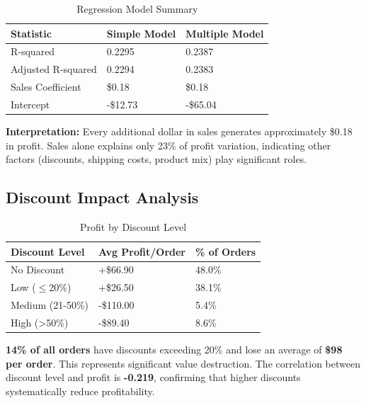 \documentclass[11pt,a4paper]{article}
\begin{document}
\begin{table}[H]
\centering
\begin{tabular}{@{}p{4cm} p{3cm} p{3cm}@{}}
\toprule
\rowcolor{primary!10}
\textbf{Statistic} & \textbf{Simple Model} & \textbf{Multiple Model} \\
\midrule
R-squared & 0.2295 & 0.2387 \\
Adjusted R-squared & 0.2294 & 0.2383 \\
Sales Coefficient & \$0.18 & \$0.18 \\
Intercept & -\$12.73 & -\$65.04 \\
\bottomrule
\end{tabular}
\caption{Regression Model Summary}
\end{table}

\textbf{Interpretation:} Every additional dollar in sales generates approximately \$0.18 in profit. Sales alone explains only 23\% of profit variation, indicating other factors (discounts, shipping costs, product mix) play significant roles.

\subsection{Discount Impact Analysis}

\begin{table}[H]
\centering
\begin{tabular}{@{}p{3.5cm} p{2.5cm} p{2.5cm}@{}}
\toprule
\rowcolor{primary!10}
\textbf{Discount Level} & \textbf{Avg Profit/Order} & \textbf{\% of Orders} \\
\midrule
\rowcolor{profitgreen!10}
No Discount & +\$66.90 & 48.0\% \\
Low ($\leq$20\%) & +\$26.50 & 38.1\% \\
\rowcolor{warningred!10}
Medium (21-50\%) & -\$110.00 & 5.4\% \\
\rowcolor{warningred!10}
High (>50\%) & -\$89.40 & 8.6\% \\
\bottomrule
\end{tabular}
\caption{Profit by Discount Level}
\end{table}

\begin{tcolorbox}[
    colback=warningred!5,
    colframe=warningred!60,
    title=\textbf{Critical Finding — Discount Correlation: -0.219},
    fonttitle=\bfseries,
    arc=6pt
]
\textbf{14\% of all orders} have discounts exceeding 20\% and lose an average of \textbf{\$98 per order}. This represents significant value destruction. The correlation between discount level and profit is \textbf{-0.219}, confirming that higher discounts systematically reduce profitability.
\end{tcolorbox}
\end{document}
